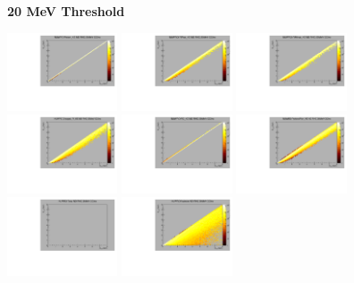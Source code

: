 \textbf{20 MeV Threshold}

\begin{center}

  \includegraphics[width=0.245\textwidth]{plots/response_matrix/Proton_KE_RHC_CCInc_20MeV.pdf}
  \includegraphics[width=0.245\textwidth]{plots/response_matrix/PiPlus_KE_RHC_CCInc_20MeV.pdf}
  \includegraphics[width=0.245\textwidth]{plots/response_matrix/PiMinus_KE_RHC_CCInc_20MeV.pdf}
  \includegraphics[width=0.245\textwidth]{plots/response_matrix/Charged_Pi_KE_RHC_CCInc_20MeV.pdf}
  \includegraphics[width=0.245\textwidth]{plots/response_matrix/Pi0_KE_RHC_CCInc_20MeV.pdf}
  \includegraphics[width=0.245\textwidth]{plots/response_matrix/Proton+Pion_KE_RHC_CCInc_20MeV.pdf}
  \includegraphics[width=0.245\textwidth]{plots/response_matrix/Total_RHC_CCInc_20MeV.pdf}
  \includegraphics[width=0.245\textwidth]{plots/response_matrix/Hadrons_RHC_CCInc_20MeV.pdf}

\end{center}

